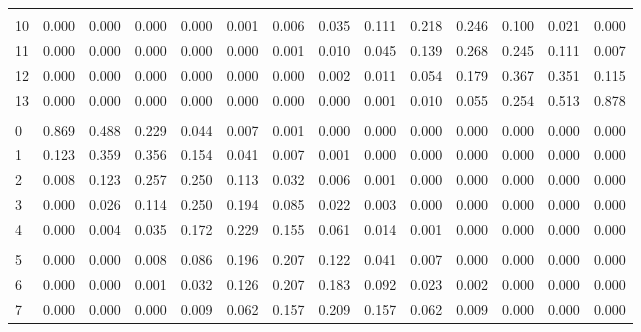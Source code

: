 \documentclass[
]{article}
\begin{document}
\begin{table}[H]
\begin{tabular}{lrrrrrrrrrrrrr}
\addlinespace[-.7em]
\multicolumn{14}{l}{ }\\
\hspace{1em}10 & 0.000 & 0.000 & 0.000 & 0.000 & 0.001 & 0.006 & 0.035 & 0.111 & 0.218 & 0.246 & 0.100 & 0.021 & 0.000\\
\hspace{1em}11 & 0.000 & 0.000 & 0.000 & 0.000 & 0.000 & 0.001 & 0.010 & 0.045 & 0.139 & 0.268 & 0.245 & 0.111 & 0.007\\
\hspace{1em}12 & 0.000 & 0.000 & 0.000 & 0.000 & 0.000 & 0.000 & 0.002 & 0.011 & 0.054 & 0.179 & 0.367 & 0.351 & 0.115\\
\hspace{1em}13 & 0.000 & 0.000 & 0.000 & 0.000 & 0.000 & 0.000 & 0.000 & 0.001 & 0.010 & 0.055 & 0.254 & 0.513 & 0.878\\
\addlinespace[0.3em]
\multicolumn{14}{l}{$n=14$}\\
\hspace{1em}0 & 0.869 & 0.488 & 0.229 & 0.044 & 0.007 & 0.001 & 0.000 & 0.000 & 0.000 & 0.000 & 0.000 & 0.000 & 0.000\\
\hspace{1em}1 & 0.123 & 0.359 & 0.356 & 0.154 & 0.041 & 0.007 & 0.001 & 0.000 & 0.000 & 0.000 & 0.000 & 0.000 & 0.000\\
\hspace{1em}2 & 0.008 & 0.123 & 0.257 & 0.250 & 0.113 & 0.032 & 0.006 & 0.001 & 0.000 & 0.000 & 0.000 & 0.000 & 0.000\\
\hspace{1em}3 & 0.000 & 0.026 & 0.114 & 0.250 & 0.194 & 0.085 & 0.022 & 0.003 & 0.000 & 0.000 & 0.000 & 0.000 & 0.000\\
\hspace{1em}4 & 0.000 & 0.004 & 0.035 & 0.172 & 0.229 & 0.155 & 0.061 & 0.014 & 0.001 & 0.000 & 0.000 & 0.000 & 0.000\\
\addlinespace[-.7em]
\multicolumn{14}{l}{ }\\
\hspace{1em}5 & 0.000 & 0.000 & 0.008 & 0.086 & 0.196 & 0.207 & 0.122 & 0.041 & 0.007 & 0.000 & 0.000 & 0.000 & 0.000\\
\hspace{1em}6 & 0.000 & 0.000 & 0.001 & 0.032 & 0.126 & 0.207 & 0.183 & 0.092 & 0.023 & 0.002 & 0.000 & 0.000 & 0.000\\
\hspace{1em}7 & 0.000 & 0.000 & 0.000 & 0.009 & 0.062 & 0.157 & 0.209 & 0.157 & 0.062 & 0.009 & 0.000 & 0.000 & 0.000\\

\end{tabular}
\end{table}
\end{document}
